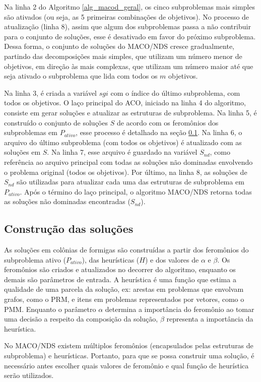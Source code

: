 Na linha 2 do Algoritmo \ref{alg_macod_geral}, os cinco subproblemas mais simples são ativados (ou seja, as 5 primeiras combinações de objetivos). No processo de atualização (linha 8), assim que algum dos subproblemas passa a não contribuir para o conjunto de soluções, esse é desativado em favor do próximo subproblema. Dessa forma, o conjunto de soluções do MACO/NDS cresce gradualmente, partindo das decomposições mais simples, que utilizam um número menor de objetivos, em direção às mais complexas, que utilizam um número maior até que seja ativado o subproblema que lida com todos os $m$ objetivos.

Na linha 3, é criada a variável $sgi$ com o índice do último subproblema, com todos os objetivos. O laço principal do ACO, iniciado na linha 4 do algoritmo, consiste em gerar soluções e atualizar as estruturas de subproblema. Na linha 5, é construído o conjunto de soluções $S$ de acordo com os feromônios dos subproblemas em $P_{ativo}$, esse processo é detalhado na seção \ref{section_macod_solutions}. Na linha 6, o arquivo do último subproblema (com todos os objetivos) é atualizado com as soluções em $S$. Na linha 7, esse arquivo é guardado na variável $S_{nd}$, como referência ao arquivo principal com todas as soluções não dominadas envolvendo o problema original (todos os objetivos). Por último, na linha 8, as soluções de $S_{nd}$ são utilizadas para atualizar cada uma das estruturas de subproblema em $P_{ativo}$. Após o término do laço principal, o algoritmo MACO/NDS retorna todas as soluções não dominadas encontradas ($S_{nd}$).

\subsection{Construção das soluções}
\label{section_macod_solutions}

As soluções em colônias de formigas são construídas a partir dos feromônios do subproblema ativo ($P_{ativo}$), das heurísticas ($H$) e dos valores de $\alpha$ e $\beta$. Os feromônios são criados e atualizados no decorrer do algoritmo, enquanto os demais são parâmetros de entrada. A heurística é uma função que estima a qualidade de uma parcela da solução, ex: arestas em problemas que envolvam grafos, como o PRM, e itens em problemas representados por vetores, como o PMM. Enquanto o parâmetro $\alpha$ determina a importância do feromônio ao tomar uma decisão a respeito da composição da solução, $\beta$ representa a importância da heurística.

No MACO/NDS existem múltiplos feromônios (encapsulados pelas estruturas de subproblema) e heurísticas. Portanto, para que se possa construir uma solução, é necessário antes escolher quais valores de feromônio e qual função de heurística serão utilizados. 

